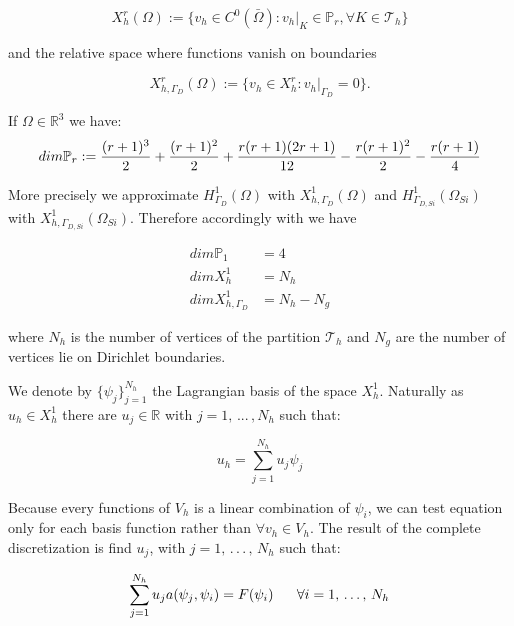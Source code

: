\begin{equation}
X^r_h(\Omega) := \{v_h \in C^0(\bar{\Omega}): v_h|_K\in \mathbb{P}_r,\forall K \in \mathcal{T}_h \}
\end{equation}

and the relative space where functions vanish on boundaries

\begin{equation}
X^r_{h,\Gamma_D}(\Omega)  := \{ v_h \in X^r_h: v_h|_{\Gamma_D} = 0 \} .
\end{equation}

If $\Omega \in \mathbb{R}^3$ we have:
\begin{equation}
\small
\label{eq: dimensione polinomi}
dim\mathbb{P}_r := \dfrac{(r+1)^3}{2} + \dfrac{(r+1)^2}{2} + \dfrac{r(r+1)(2r+1)}{12} - \dfrac{r(r+1)^2}{2} - \dfrac{r(r+1)}{4}
\end{equation}

More precisely we approximate $H^1_{\Gamma_D}(\Omega)$ with $X^1_{h,\Gamma_D}(\Omega)$ and $H^1_{\Gamma_{D,Si}}(\Omega_{Si})$ with $X^1_{h,\Gamma_{D,Si}}(\Omega_{Si})$. Therefore accordingly with  we have

\begin{align*}
dim \mathbb{P}_1 & = 4 \\
dim X^1_h & = N_h \\
dim X^1_{h,\Gamma_D} & = N_h - N_g
\end{align*}

where $N_h$ is the number of vertices of the partition $\mathcal{T}_h$ and $N_g$ are the number of vertices lie on Dirichlet boundaries.

We denote by $\{ \psi_j \}_{j=1}^{N_h} $ the Lagrangian basis of the space $X^1_{h}$. Naturally  as $u_h \in X^1_{h}$ there are $u_j \in \mathbb{R}$ with $j=1,\, ... \,, N_h$ such that:


\begin{equation}
u_h = \sum_{j=1}^{N_h} u_j \psi_j
\end{equation}

Because every functions of $V_h$ is a linear combination of $\psi_i$, we can test equation  only for each basis function rather than $\forall v_h \in V_h$. The result of the complete discretization is find $u_j$, with $j = 1, \, . \, . \, . \, , \, N_h$ such that:

\begin{equation}
\sum_{j=1}^{N_h}u_ja(\psi_j,\psi_i) = F(\psi_i) \psp{10} \forall i = 1, \, . \, . \, . \, , \, N_h
\end{equation}

